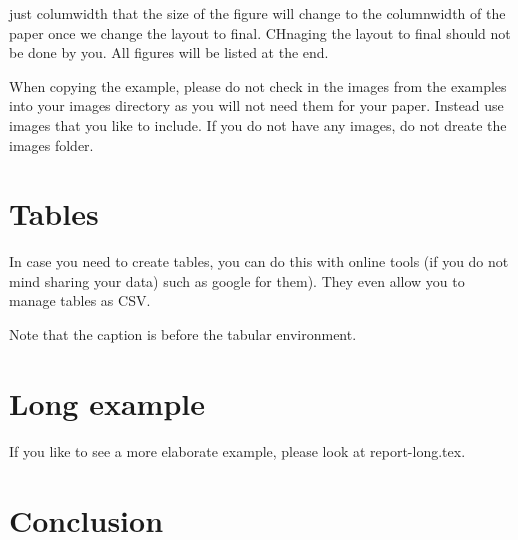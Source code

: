 \documentclass[sigconf]{acmart}
\begin{document}
just columwidth that the size of the figure will change to the
columnwidth of the paper once we change the layout to final. CHnaging
the layout to final should not be done by you. All figures will be
listed at the end.


When copying the example, please do not check in the images from the
examples into your images directory as you will not need them for your
paper. Instead use images that you like to include. If you do not have
any images, do not dreate the images folder.

\section{Tables}

In case you need to create tables, you can do this with online tools
(if you do not mind sharing your data) such as
google for them). They even allow you to manage tables as CSV.

Note that the caption is before the tabular environment.


\section{Long example}

If you like to see a more elaborate example, please look at
report-long.tex. 

\section{Conclusion}
\end{document}
